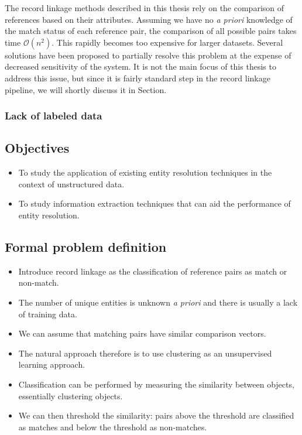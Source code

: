 \documentclass[paper=a4, fontsize=11pt]{scrartcl}
\begin{document}
The record linkage methods described in this thesis rely on the comparison of references based on their attributes.
Assuming we have no \emph{a priori} knowledge of the match status of each reference pair, the comparison of all possible pairs takes time $\mathcal{O}(n^2)$.
This rapidly becomes too expensive for larger datasets.
Several solutions have been proposed to partially resolve this problem at the expense of decreased sensitivity of the system.
It is not the main focus of this thesis to address this issue, but since it is fairly standard step in the record linkage pipeline, we will shortly discuss it in Section.

\subsubsection{Lack of labeled data}

\subsection{Objectives}
\label{sec:objectives}

\begin{itemize}
	\item To study the application of existing entity resolution techniques in the context of unstructured data.
	\item To study information extraction techniques that can aid the performance of entity resolution.
\end{itemize}

\subsection{Formal problem definition}
\label{sec:formal_problem_definition}

\begin{itemize}
    \item Introduce record linkage as the classification of reference pairs as match or non-match.
    \item The number of unique entities is unknown \emph{a priori} and there is usually a lack of training data.
    \item We can assume that matching pairs have similar comparison vectors.
    \item The natural approach therefore is to use clustering as an unsupervised learning approach.
    \item Classification can be performed by measuring the similarity between objects, essentially clustering objects.
    \item We can then threshold the similarity: pairs above the threshold are classified as matches and below the threshold as non-matches.
\end{itemize}
\end{document}
